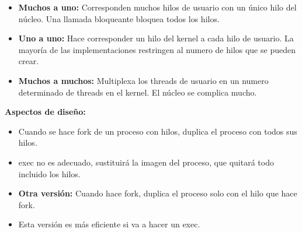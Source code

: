\documentclass[12pt, twoside, openright]{report} %
\begin{document}
  \begin{itemize}
  \item \textbf{Muchos a uno:} Corresponden muchos hilos de usuario con un
    único hilo del núcleo. Una llamada bloqueante bloquea todos los
    hilos.
    
  \item \textbf{Uno a uno:} Hace corresponder un hilo del kernel a cada hilo
    de usuario. La mayoría de las implementaciones restringen al numero
    de hilos que se pueden crear.
    
  \item \textbf{Muchos a muchos:} Multiplexa los threads de usuario en un
    numero determinado de threads en el kernel. El núcleo se complica
    mucho.
    
  \end{itemize}
  \pagebreak
\textbf{Aspectos de diseño:}
  

  \begin{itemize}
  \item Cuando se hace fork de un proceso con hilos, duplica el proceso con
    todos sus hilos.
    
  \item exec no es adecuado, sustituirá la imagen del proceso, que quitará
    todo incluido los hilos.
    
  \item \textbf{Otra versión:} Cuando hace fork, duplica el proceso solo con
    el hilo que hace fork.
    
  \item Esta versión es más eficiente si va a hacer un exec.
    
  \end{itemize}
\end{document}
